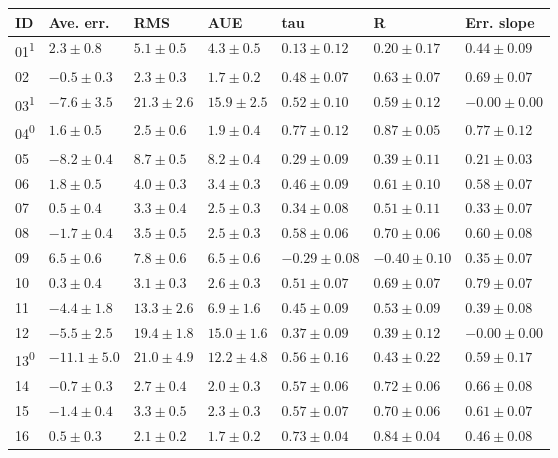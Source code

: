 \footnotesize
\begin{tabular}{l l l l l l l}
\hline
ID & Ave. err. & RMS & AUE & tau & R & Err. slope \\ 
\hline
01\textsuperscript{1} & $2.3 \pm 0.8$ & $5.1 \pm 0.5$ & $4.3 \pm 0.5$ & $0.13 \pm 0.12$ & $0.20 \pm 0.17$ & $0.44 \pm 0.09$ \\ 
02 & $-0.5 \pm 0.3$ & $2.3 \pm 0.3$ & $1.7 \pm 0.2$ & $0.48 \pm 0.07$ & $0.63 \pm 0.07$ & $0.69 \pm 0.07$ \\ 
03\textsuperscript{1} & $-7.6 \pm 3.5$ & $21.3 \pm 2.6$ & $15.9 \pm 2.5$ & $0.52 \pm 0.10$ & $0.59 \pm 0.12$ & $-0.00 \pm 0.00$ \\ 
04\textsuperscript{0} & $1.6 \pm 0.5$ & $2.5 \pm 0.6$ & $1.9 \pm 0.4$ & $0.77 \pm 0.12$ & $0.87 \pm 0.05$ & $0.77 \pm 0.12$ \\ 
05 & $-8.2 \pm 0.4$ & $8.7 \pm 0.5$ & $8.2 \pm 0.4$ & $0.29 \pm 0.09$ & $0.39 \pm 0.11$ & $0.21 \pm 0.03$ \\ 
06 & $1.8 \pm 0.5$ & $4.0 \pm 0.3$ & $3.4 \pm 0.3$ & $0.46 \pm 0.09$ & $0.61 \pm 0.10$ & $0.58 \pm 0.07$ \\ 
07 & $0.5 \pm 0.4$ & $3.3 \pm 0.4$ & $2.5 \pm 0.3$ & $0.34 \pm 0.08$ & $0.51 \pm 0.11$ & $0.33 \pm 0.07$ \\ 
08 & $-1.7 \pm 0.4$ & $3.5 \pm 0.5$ & $2.5 \pm 0.3$ & $0.58 \pm 0.06$ & $0.70 \pm 0.06$ & $0.60 \pm 0.08$ \\ 
09 & $6.5 \pm 0.6$ & $7.8 \pm 0.6$ & $6.5 \pm 0.6$ & $-0.29 \pm 0.08$ & $-0.40 \pm 0.10$ & $0.35 \pm 0.07$ \\ 
10 & $0.3 \pm 0.4$ & $3.1 \pm 0.3$ & $2.6 \pm 0.3$ & $0.51 \pm 0.07$ & $0.69 \pm 0.07$ & $0.79 \pm 0.07$ \\ 
11 & $-4.4 \pm 1.8$ & $13.3 \pm 2.6$ & $6.9 \pm 1.6$ & $0.45 \pm 0.09$ & $0.53 \pm 0.09$ & $0.39 \pm 0.08$ \\ 
12 & $-5.5 \pm 2.5$ & $19.4 \pm 1.8$ & $15.0 \pm 1.6$ & $0.37 \pm 0.09$ & $0.39 \pm 0.12$ & $-0.00 \pm 0.00$ \\ 
13\textsuperscript{0} & $-11.1 \pm 5.0$ & $21.0 \pm 4.9$ & $12.2 \pm 4.8$ & $0.56 \pm 0.16$ & $0.43 \pm 0.22$ & $0.59 \pm 0.17$ \\ 
14 & $-0.7 \pm 0.3$ & $2.7 \pm 0.4$ & $2.0 \pm 0.3$ & $0.57 \pm 0.06$ & $0.72 \pm 0.06$ & $0.66 \pm 0.08$ \\ 
15 & $-1.4 \pm 0.4$ & $3.3 \pm 0.5$ & $2.3 \pm 0.3$ & $0.57 \pm 0.07$ & $0.70 \pm 0.06$ & $0.61 \pm 0.07$ \\ 
16 & $0.5 \pm 0.3$ & $2.1 \pm 0.2$ & $1.7 \pm 0.2$ & $0.73 \pm 0.04$ & $0.84 \pm 0.04$ & $0.46 \pm 0.08$ \\ 

\end{tabular}

